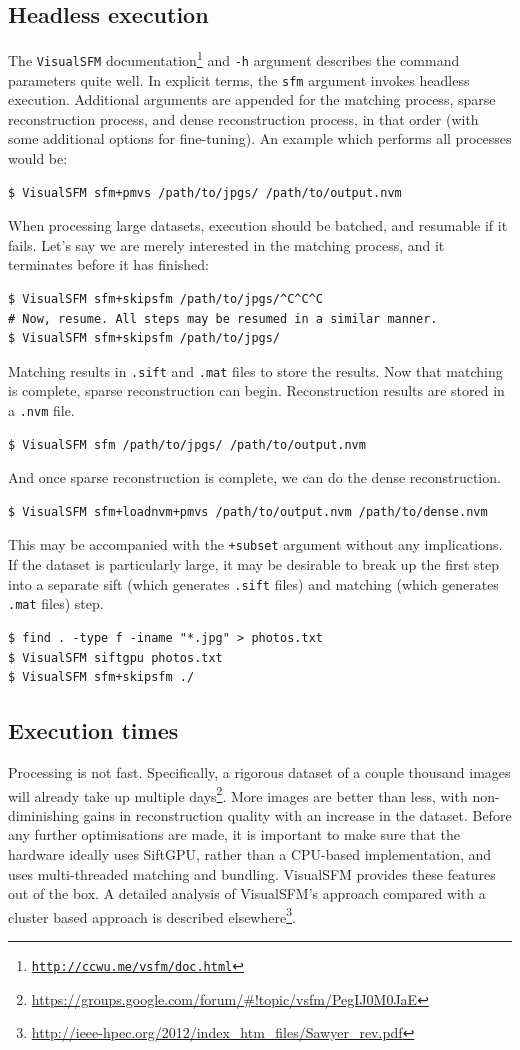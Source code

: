 \documentclass{article}
\begin{document}
\subsection{Headless execution}
The {\tt VisualSFM} documentation\footnote{{\tt \url{http://ccwu.me/vsfm/doc.html}}} and {\tt -h} argument describes the command parameters quite well. In explicit terms, the {\tt sfm} argument invokes headless execution. Additional arguments are appended for the matching process, sparse reconstruction process, and dense reconstruction process, in that order (with some additional options for fine-tuning). An example which performs all processes would be:
\begin{lstlisting}
$ VisualSFM sfm+pmvs /path/to/jpgs/ /path/to/output.nvm
\end{lstlisting}
When processing large datasets, execution should be batched, and resumable if it fails. Let's say we are merely interested in the matching process, and it terminates before it has finished:
\begin{lstlisting}
$ VisualSFM sfm+skipsfm /path/to/jpgs/^C^C^C
# Now, resume. All steps may be resumed in a similar manner.
$ VisualSFM sfm+skipsfm /path/to/jpgs/
\end{lstlisting}
Matching results in {\tt *.sift} and {\tt *.mat} files to store the results. Now that matching is complete, sparse reconstruction can begin. Reconstruction results are stored in a {\tt .nvm} file.
\begin{lstlisting}
$ VisualSFM sfm /path/to/jpgs/ /path/to/output.nvm
\end{lstlisting}
And once sparse reconstruction is complete, we can do the dense reconstruction.
\begin{lstlisting}
$ VisualSFM sfm+loadnvm+pmvs /path/to/output.nvm /path/to/dense.nvm
\end{lstlisting}
This may be accompanied with the {\tt +subset} argument without any implications.
If the dataset is particularly large, it may be desirable to break up the first step into a separate sift (which generates {\tt .sift} files) and matching (which generates {\tt .mat} files) step.
\begin{lstlisting}
$ find . -type f -iname "*.jpg" > photos.txt
$ VisualSFM siftgpu photos.txt
$ VisualSFM sfm+skipsfm ./
\end{lstlisting}
\subsection{Execution times}
Processing is not fast. Specifically, a rigorous dataset of a couple thousand images will already take up multiple days\footnote{\url{https://groups.google.com/forum/\#!topic/vsfm/PegIJ0M0JaE}}. More images are better than less, with non-diminishing gains in reconstruction quality with an increase in the dataset. Before any further optimisations are made, it is important to make sure that the hardware ideally uses SiftGPU, rather than a CPU-based implementation, and uses multi-threaded matching and bundling. VisualSFM provides these features out of the box. A detailed analysis of VisualSFM's approach compared with a cluster based approach is described elsewhere\footnote{\url{http://ieee-hpec.org/2012/index\_htm\_files/Sawyer\_rev.pdf}}.
\end{document}
